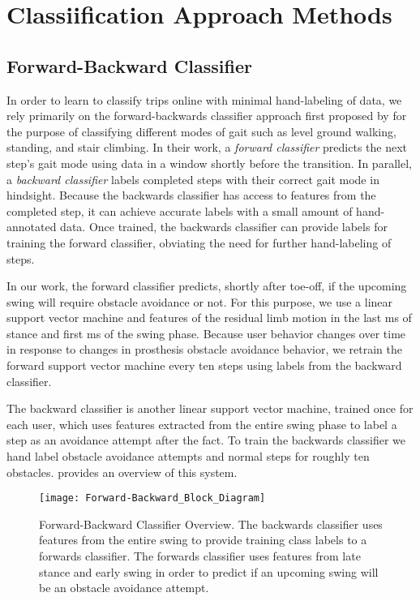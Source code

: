 \section{Classiification Approach Methods}
\subsection{Forward-Backward Classifier}
In order to learn to classify trips online with minimal hand-labeling of data,
we rely primarily on the forward-backwards classifier approach first proposed by
\citet{spanias2018online} for the purpose of classifying different modes of gait
such as level ground walking, standing, and stair climbing. In their work, a
\emph{forward classifier} predicts the next step's gait mode using data in a
window shortly before the transition. In parallel, a \emph{backward classifier}
labels completed steps with their correct gait mode in hindsight. Because the
backwards classifier has access to features from the completed step, it can
achieve accurate labels with a small amount of hand-annotated data. Once
trained, the backwards classifier can provide labels for training the forward
classifier, obviating the need for further hand-labeling of steps. 

In our work, the forward classifier predicts, shortly after toe-off, if the
upcoming swing will require obstacle avoidance or not. For this purpose, we use
a linear support vector machine and features of the residual limb motion in the
last \unit[210]{ms} of stance and first \unit[90]{ms} of the swing phase.
Because user behavior changes over time in response to changes in prosthesis
obstacle avoidance behavior, we retrain the forward support vector machine every
ten steps using labels from the backward classifier. 

The backward classifier is another linear support vector machine, trained once
for each user, which uses features extracted from the entire swing phase to
label a step as an avoidance attempt after the fact. To train the backwards
classifier we hand label obstacle avoidance attempts and normal steps for
roughly ten obstacles.  provides an overview of this system.

\begin{figure}[tb]
\centerline{\texttt{[image: Forward-Backward\_Block\_Diagram]}}
\caption{Forward-Backward Classifier Overview. The backwards classifier uses
features from the entire swing to provide training class labels to a forwards
classifier. The forwards classifier uses features from late stance and early
swing in order to predict if an upcoming swing will be an obstacle avoidance
attempt.}\label{fig:fwd_back}
\end{figure}

